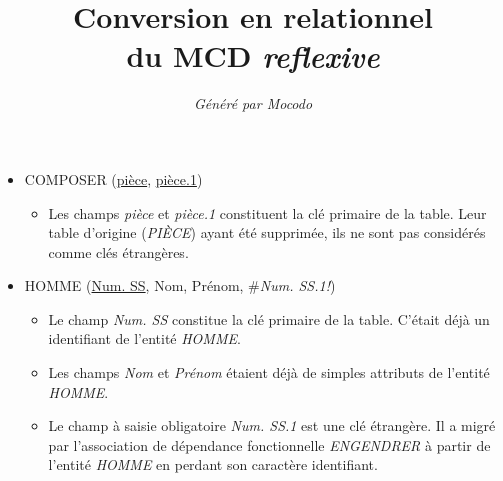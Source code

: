 \documentclass[a4paper]{article}
\title{Conversion en relationnel\\du MCD \emph{reflexive}}
\author{\emph{Généré par Mocodo}}
\newcommand{\relat}[1]{\textsc{#1}}
\newcommand{\attr}[1]{#1}
\newcommand{\prim}[1]{\uline{#1}}
\newcommand{\foreign}[1]{\#\textsl{#1}}
\begin{document}
\maketitle

\begin{itemize}
  \item \relat{COMPOSER} (\prim{pièce}, \prim{pièce.1})
  \begin{itemize}
    \item Les champs \emph{pièce} et \emph{pièce.1} constituent la clé primaire de la table. Leur table d'origine (\emph{PIÈCE}) ayant été supprimée, ils ne sont pas considérés comme clés étrangères.
  \end{itemize}

  \item \relat{HOMME} (\prim{Num. SS}, \attr{Nom}, \attr{Prénom}, \foreign{Num. SS.1!})
  \begin{itemize}
    \item Le champ \emph{Num. SS} constitue la clé primaire de la table. C'était déjà un identifiant de l'entité \emph{HOMME}.
    \item Les champs \emph{Nom} et \emph{Prénom} étaient déjà de simples attributs de l'entité \emph{HOMME}.
    \item Le champ à saisie obligatoire \emph{Num. SS.1} est une clé étrangère. Il a migré par l'association de dépendance fonctionnelle \emph{ENGENDRER} à partir de l'entité \emph{HOMME} en perdant son caractère identifiant.
  \end{itemize}

\end{itemize}
\end{document}
